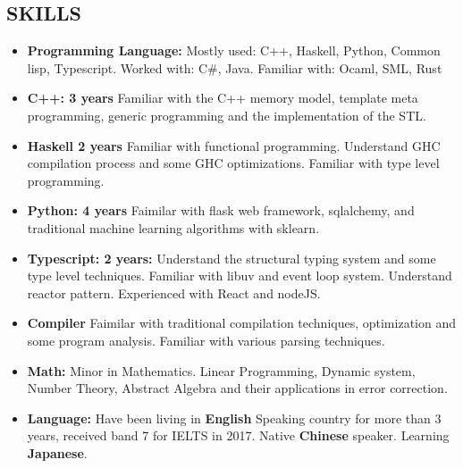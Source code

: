 \documentclass{res}
\begin{document}
\begin{resume}
\section{SKILLS}
    \begin{itemize}[leftmargin=-.2in]
        \setlength\itemsep{-1em}
        \item \textbf{Programming Language:} Mostly used: C++, Haskell, Python, Common lisp, Typescript. Worked with: C\#, Java. Familiar with: Ocaml, SML, Rust \\
        \item \textbf{C++: 3 years}
          Familiar with the C++ memory model, template meta programming,
          generic programming and the implementation of the STL.  \\
        \item \textbf{Haskell 2 years}
          Familiar with functional programming.
          Understand GHC compilation process and some GHC optimizations.
          Familiar with type level programming.\\
        \item \textbf{Python: 4 years}
          Faimilar with flask web framework, sqlalchemy, and
          traditional machine learning algorithms with sklearn. \\
        \item \textbf{Typescript: 2 years:}
          Understand the structural typing system and some type level techniques.
          Familiar with libuv and event loop system. Understand reactor pattern.
          Experienced with React and nodeJS. \\
        \item \textbf{Compiler} Faimilar with traditional compilation techniques, optimization and some program analysis. Familiar with various parsing techniques. \\
        \item \textbf{Math:}
          Minor in Mathematics.
          Linear Programming, Dynamic system, Number Theory, Abstract Algebra and their applications in error correction.  \\
        \item \textbf{Language:} Have been living in \textbf{English} Speaking country for more than 3 years, received band 7 for IELTS in 2017. Native \textbf{Chinese} speaker. Learning \textbf{Japanese}.
    \end{itemize}

\end{resume}
\end{document}
